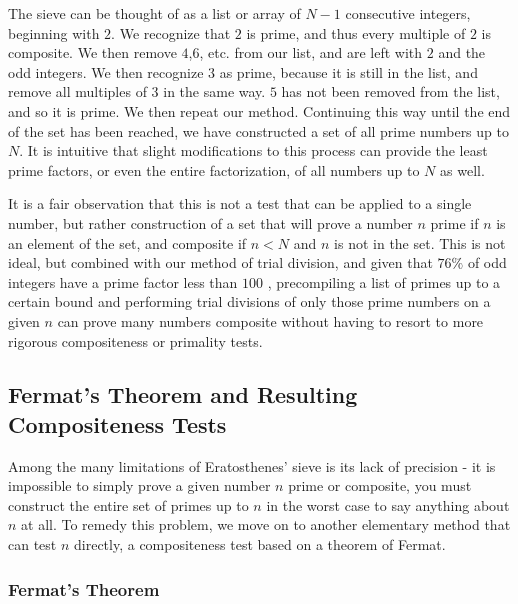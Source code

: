 \documentclass{article}
\begin{document}
\par The sieve can be thought of as a list or array of $N - 1$ consecutive integers, beginning with $2$. We recognize that $2$ is prime, and thus every multiple of $2$ is composite. We then remove $4$,$6$, etc. from our list, and are left with $2$ and the odd integers. We then recognize $3$ as prime, because it is still in the list, and remove all multiples of $3$ in the same way. $5$ has not been removed from the list, and so it is prime. We then repeat our method. Continuing this way until the end of the set has been reached, we have constructed a set of all prime numbers up to $N$. It is intuitive that slight modifications to this process can provide the least prime factors, or even the entire factorization, of all numbers up to $N$ as well.

\par It is a fair observation that this is not a test that can be applied to a single number, but rather construction of a set that will prove a number $n$ prime if $n$ is an element of the set, and composite if $n < N$ and $n$ is not in the set. This is not ideal, but combined with our method of trial division, and given that $76\%$ of odd integers have a prime factor less than $100$ \citep{riesel}, precompiling a list of primes up to a certain bound and performing trial divisions of only those prime numbers on a given $n$ can prove many numbers composite without having to resort to more rigorous compositeness or primality tests.

\subsection* {Fermat's Theorem and Resulting Compositeness Tests}

\par Among the many limitations of Eratosthenes' sieve is its lack of precision - it is impossible to simply prove a given number $n$ prime or composite, you must construct the entire set of primes up to $n$ in the worst case to say anything about $n$ at all. To remedy this problem, we move on to another elementary method that can test $n$ directly, a compositeness test based on a theorem of Fermat.

\subsubsection*{Fermat's Theorem}
\end{document}
